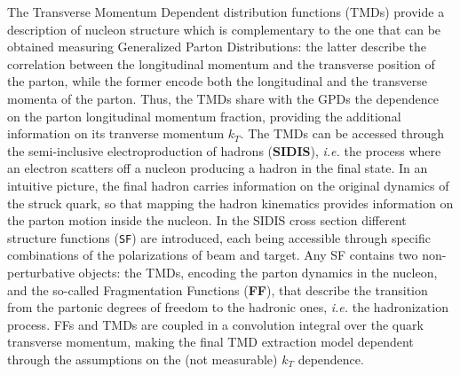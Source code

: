 The Transverse Momentum Dependent distribution functions (TMDs) provide a description of nucleon structure which is complementary to the one that can be obtained measuring Generalized Parton Distributions: the latter describe the correlation between the longitudinal momentum and the transverse position of the parton, while the former encode both the longitudinal and the transverse momenta of the parton. 
%
Thus, the TMDs share with the GPDs the dependence on the parton longitudinal momentum fraction, providing the additional information on its tranverse momentum $k_T$. 
The TMDs can be accessed through the semi-inclusive electroproduction of hadrons (\textbf{SIDIS}), \textit{i.e.} the process where an electron scatters off a nucleon producing a hadron in the final state. In an intuitive picture, the final hadron carries information on the original dynamics of the struck quark, so that mapping the hadron kinematics provides information on the parton motion inside the nucleon.
In the SIDIS cross section different structure functions (\texttt{SF}) are introduced, each being accessible through specific combinations of the polarizations of beam and target.
Any SF contains two non-perturbative objects: the TMDs, encoding the parton dynamics in the nucleon, and the so-called Fragmentation Functions (\textbf{FF}), that describe the transition from the partonic degrees of freedom to the hadronic ones, \textit{i.e.} the hadronization process.
FFs and TMDs are coupled in a convolution integral over the quark transverse momentum, making the final TMD extraction model dependent through the assumptions on the (not measurable) $k_T$ dependence.\\

